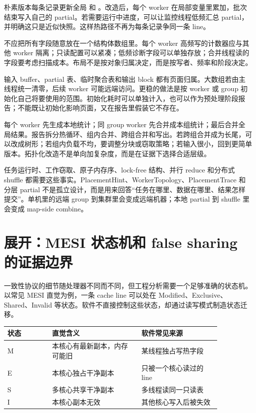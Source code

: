 朴素版本每条记录更新全局  和 。改造后，每个 worker 在局部变量里累加，批次结束写入自己的 partial。若需要运行中进度，可以让监控线程低频汇总 partial，并明确这只是近似快照。这样热路径不再为每条记录争同一条 line。

 不应把所有字段随意放在一个结构体数组里。每个 worker 高频写的计数器应与其他 worker 隔离；只读配置可以紧凑；低频诊断字段可以单独存放；合并线程读的字段要考虑扫描成本。布局不是按对象归属决定，而是按写者、频率和阶段决定。

输入 buffer、partial 表、临时聚合表和输出 block 都有页面归属。大数组若由主线程统一清零，后续 worker 可能远端访问。更稳的做法是按 worker 或 group 初始化自己将要使用的范围。初始化耗时可以单独计入，也可以作为预处理阶段报告；不能既让初始化影响页面，又在报告里假装它不存在。

每个 worker 先生成本地统计；同 group worker 先合并成本组统计；最后合并全局结果。报告拆分热循环、组内合并、跨组合并和写出。若跨组合并成为长尾，可以改成树形；若组内负载不均，要调整分块或窃取策略；若输入很小，回到更简单版本。拓扑化改造不是单向加复杂度，而是在证据下选择合适层级。

任务运行时、工作窃取、原子内存序、lock-free 结构、并行 reduce 和分布式 shuffle 都需要这些事实。PlacementHint、WorkerTopology、PlacementTrace 和分层 partial 不是孤立设计，而是用来回答“任务在哪里、数据在哪里、结果怎样提交”。单机里的远端 group 到集群里会变成远端机器；本地 partial 到 shuffle 里会变成 map-side combine。

\section{展开：MESI 状态机和 false sharing 的证据边界}

一致性协议的细节随处理器不同而不同，但工程分析需要一个足够准确的状态机。以常见 MESI 直觉为例，一条 cache line 可以处在 Modified、Exclusive、Shared、Invalid 等状态。软件不直接控制这些状态，却通过读写模式制造状态迁移。

\begin{center}
\begin{tabular}{p{0.18\linewidth}p{0.36\linewidth}p{0.32\linewidth}}
\toprule
状态 & 直觉含义 & 软件常见来源 \\
\midrule
M & 本核心有最新副本，内存可能旧 & 某线程独占写热字段 \\
E & 本核心独占干净副本 & 只被一个核心读过的 line \\
S & 多核心共享干净副本 & 多线程读同一只读表 \\
I & 本核心副本无效 & 其他核心写入后被失效 \\
\bottomrule
\end{tabular}
\end{center}


